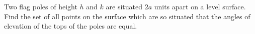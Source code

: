 Two flag poles of height $h$ and $k$ are situated $2a$ units apart on a level surface. Find the set of all points on the surface which are so situated that the angles of elevation of the tops of the poles are equal.